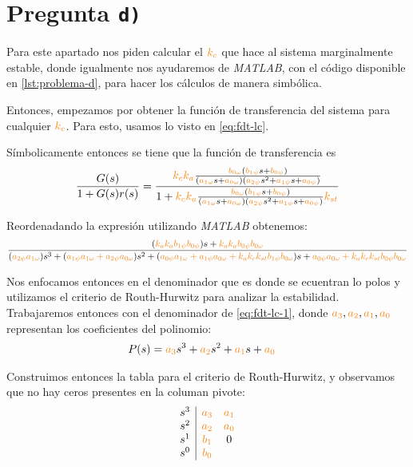 \section{Pregunta \texttt{d)}}\label{pregunta-d}

Para este apartado nos piden calcular el $\nara{k_{c}}$ que hace al sistema
marginalmente estable, donde igualmente nos ayudaremos de \textit{MATLAB}, con
el código disponible en \autoref{lst:problema-d}, para hacer los cálculos
de manera simbólica.

Entonces, empezamos por obtener la función de transferencia del sistema para
cualquier $\nara{k_{c}}$. Para esto, usamos lo visto en \eqref{eq:fdt-lc}.

Símbolicamente entonces se tiene que la función de transferencia es
\begin{equation}
    \frac{G(s)}{1 + G(s)r(s)} = \dfrac{\nara{k_ck_a} \frac{\nara{\nara{b_{0\omega}}}\left(\nara{b_{1\psi}}s + \nara{b_{0\psi}}\right)}
    {\left(\nara{a_{1\omega}}s + \nara{a_{0\omega}}\right)\left(\nara{a_{2\psi}}s^{2} + \nara{a_{1\psi}}s + \nara{a_{0\psi}}\right)}}{1+\nara{k_ck_a} \frac{\nara{\nara{b_{0\omega}}}\left(\nara{b_{1\psi}}s + \nara{b_{0\psi}}\right)}
    {\left(\nara{a_{1\omega}}s + \nara{a_{0\omega}}\right)\left(\nara{a_{2\psi}}s^{2} + \nara{a_{1\psi}}s + \nara{a_{0\psi}}\right)}\nara{k_{st}}}
\end{equation}

Reordenadando la expresión utilizando \textit{MATLAB} obtenemos:
\begin{equation}\label{eq:fdt-lc-1}
    \frac{(\nara{k_a k_a b_{1\psi} b_{0\psi}})s + \nara{k_a k_a b_{0\psi} b_{0\omega}}}
    {(\nara{a_{2\psi} a_{1\omega}})s^3 + (\nara{a_{1\psi} a_{1\omega} + a_{2\psi} a_{0\omega}})s^2 + (\nara{a_{0\psi} a_{1\omega} + a_{1\psi} a_{0\omega} + k_a k_c k_{st} b_{1\psi} b_{0\omega}})s + \nara{a_{0\psi} a_{0\omega} + k_a k_c k_{st} b_{0\psi} b_{0\omega}}}
\end{equation}

Nos enfocamos entonces en el denominador que es donde se ecuentran lo polos y
utilizamos el criterio de Routh-Hurwitz para analizar la estabilidad. Trabajaremos
entonces con el denominador de \eqref{eq:fdt-lc-1}, donde $\nara{a_3},\nara{a_2},\nara{a_1},\nara{a_0}$
representan los coeficientes del polinomio:
\begin{align}
    P(s) = \nara{a_3} s^3 + \nara{a_2} s^2 + \nara{a_1} s + \nara{a_0} &
\end{align}

Construimos entonces la tabla para el criterio de Routh-Hurwitz, y observamos
que no hay ceros presentes en la columan pivote:
\begin{equation}
  \begin{array}{c|cc}
    s^3 & \nara{a_3} & \nara{a_1} \\
    s^2 & \nara{a_2} & \nara{a_0} \\
    s^1 & \nara{b_1} & 0 \\
    s^0 & \nara{b_0} & 
  \end{array}
\end{equation}

